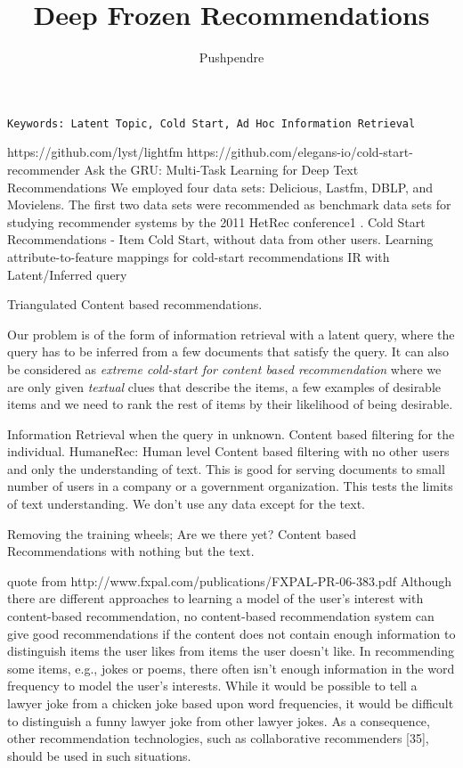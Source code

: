 \documentclass[14pt]{article}
\title{Deep Frozen Recommendations}
\author{Pushpendre}
\begin{document}
\maketitle
\texttt{Keywords: Latent Topic, Cold Start, Ad Hoc Information Retrieval}

https://github.com/lyst/lightfm
https://github.com/elegans-io/cold-start-recommender
Ask the GRU: Multi-Task Learning for Deep Text Recommendations
We employed four data sets: Delicious, Lastfm, DBLP, and Movielens. The first
two data sets were recommended as benchmark data sets for studying recommender
systems by the 2011 HetRec conference1 .
Cold Start Recommendations - Item Cold Start, without data from other users.
Learning attribute-to-feature mappings for cold-start recommendations
IR with Latent/Inferred query


Triangulated Content based recommendations.

Our problem is of the form of information retrieval with a latent query,
where the query has to be inferred from a few documents that satisfy the query.
It can also be considered as \textit{extreme cold-start for content based recommendation} where we are only
given \textit{textual} clues that describe the items, a few examples of
desirable items and we need to rank the rest of items by their
likelihood of being desirable.

Information Retrieval when the query in unknown.
Content based filtering for the individual.
HumaneRec: Human level Content based filtering with no other users and only the
understanding of text.
This is good for serving documents to small number of users in a company or a
government organization. This tests the limits of text understanding.
We don't use any data except for the text.

Removing the training wheels; Are we there yet? Content based Recommendations with nothing but the text.

quote from http://www.fxpal.com/publications/FXPAL-PR-06-383.pdf
Although there are different approaches to learning a model of the user’s interest with
content-based recommendation, no content-based recommendation system can give
good recommendations if the content does not contain enough information to
distinguish items the user likes from items the user doesn’t like. In recommending
some items, e.g., jokes or poems, there often isn’t enough information in the word
frequency to model the user’s interests. While it would be possible to tell a lawyer
joke from a chicken joke based upon word frequencies, it would be difficult to
distinguish a funny lawyer joke from other lawyer jokes. As a consequence, other
recommendation technologies, such as collaborative recommenders [35], should be
used in such situations.
\end{document}
